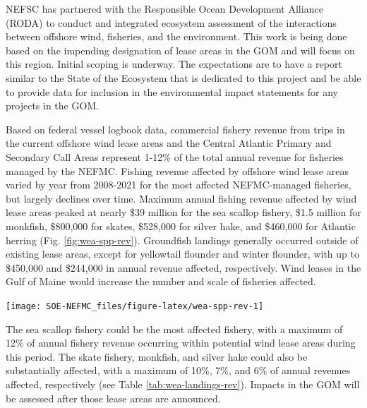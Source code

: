 \documentclass[
  10pt,
]{article}
\let\origfigure\figure
\let\endorigfigure\endfigure
\renewenvironment{figure}[1][2] {
    \expandafter\origfigure\expandafter[H]
} {
    \endorigfigure
}
\begin{document}
NEFSC has partnered with the Responsible Ocean Development Alliance (RODA) to conduct and integrated ecosystem assessment of the interactions between offshore wind, fisheries, and the environment. This work is being done based on the impending designation of lease areas in the GOM and will focus on this region. Initial scoping is underway. The expectations are to have a report similar to the State of the Ecosystem that is dedicated to this project and be able to provide data for inclusion in the environmental impact statements for any projects in the GOM.

Based on federal vessel logbook data, commercial fishery revenue from trips in the current offshore wind lease areas and the Central Atlantic Primary and Secondary Call Areas represent 1-12\% of the total annual revenue for fisheries managed by the NEFMC. Fishing revenue affected by offshore wind lease areas varied by year from 2008-2021 for the most affected NEFMC-managed fisheries, but largely declines over time. Maximum annual fishing revenue affected by wind lease areas peaked at nearly \$39 million for the sea scallop fishery, \$1.5 million for monkfish, \$800,000 for skates, \$528,000 for silver hake, and \$460,000 for Atlantic herring (Fig. \ref{fig:wea-spp-rev}). Groundfish landings generally occurred outside of existing lease areas, except for yellowtail flounder and winter flounder, with up to \$450,000 and \$244,000 in annual revenue affected, respectively. Wind leases in the Gulf of Maine would increase the number and scale of fisheries affected.

\begin{figure}

{\centering \texttt{[image: SOE-NEFMC\_files/figure-latex/wea-spp-rev-1]} 

}

\caption{Fishery revenues from NEFMC managed species in the Wind energy lease areas.}\label{fig:wea-spp-rev}
\end{figure}

The sea scallop fishery could be the most affected fishery, with a maximum of 12\% of annual fishery revenue occurring within potential wind lease areas during this period. The skate fishery, monkfish, and silver hake could also be substantially affected, with a maximum of 10\%, 7\%, and 6\% of annual revenues affected, respectively (see Table \ref{tab:wea-landings-rev}). Impacts in the GOM will be assessed after those lease areas are announced.

\providecommand{\docline}[3]{\noalign{\global\setlength{\arrayrulewidth}{#1}}\arrayrulecolor[HTML]{#2}\cline{#3}}
\end{document}

